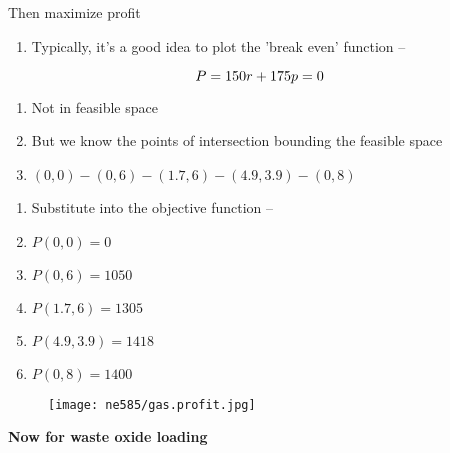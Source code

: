 \documentclass[aspectratio=1610,pdftex,dvipsnames,compress,xcolor={dvipsnames}]{beamer}
\begin{document}
\begin{frame}{Then maximize profit}
    \begin{enumerate}[series=outerlist,topsep=0pt,itemsep=1pt,leftmargin=*,label=(\arabic*)]
        \item[]Typically, it's a good idea to plot the 'break even' function --
    \end{enumerate}

    \vspace*{\fill}

    \begin{equation}
        \LARGE
        P = 150r +175p = 0
    \end{equation}

    \vspace*{\fill}

    \begin{enumerate}[series=outerlist,topsep=0pt,itemsep=1pt,leftmargin=*,label=(\arabic*)]
        \item[]Not in feasible space
            \vspace{0.05in}
        \item[]But we know the points of intersection bounding the feasible space
        \item[]$(0,0) - (0,6) - (1.7,6) - (4.9,3.9) - (0,8)$
    \end{enumerate}

    \begin{enumerate}[series=outerlist,topsep=9pt,itemsep=5pt,leftmargin=*,label=(\arabic*)]
        \item[]Substitute into the objective function --
        \item[]$P(0,0) = 0$
        \item[]$P(0,6) = 1050$
        \item[]$P(1.7,6) = 1305$
        \item[]$P(4.9,3.9) = 1418$ 
        \item[]$P(0,8) = 1400$
    \end{enumerate}
\end{frame}


\begin{frame}{}
    \begin{figure}
        \centering
        \texttt{[image: ne585/gas.profit.jpg]}
    \end{figure}
\end{frame}


\begin{frame}[plain]{}
    \centering\Large\textbf{Now for waste oxide loading}
\end{frame}
\end{document}
